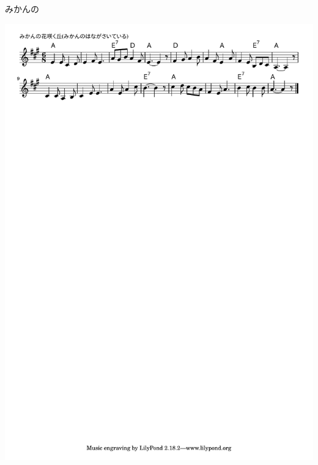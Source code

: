 \documentclass[]{ltjsarticle}
\begin{document}
みかんの

\includegraphics[viewport=15 700 300 830]{mikan.pdf}
\end{document}
